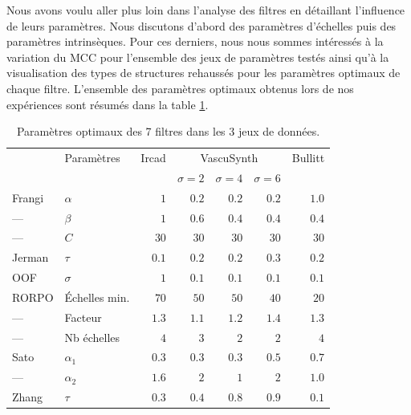 Nous avons voulu aller plus loin dans l'analyse des filtres en détaillant l'influence de leurs paramètres. Nous discutons d'abord des paramètres d'échelles puis des paramètres intrinsèques. Pour ces derniers, nous nous sommes intéressés à la variation du MCC pour l'ensemble des jeux de paramètres testés ainsi qu'à la visualisation des types de structures rehaussés pour les paramètres optimaux de chaque filtre. L'ensemble des paramètres optimaux obtenus lors de nos expériences sont résumés dans la table \ref{tab:optimal_parameters}.
\begin{table}[!ht]
  \begin{center}
  \caption{Paramètres optimaux des 7 filtres dans les 3 jeux de données.}
      \begin{tabular}{llrrrrr}
                          \hline
             & Paramètres  & Ircad       &  \multicolumn{3}{c}{VascuSynth}            &  Bullitt\\
             &   &         & $\sigma = 2$  & $\sigma = 4$ & $\sigma = 6$ &       \\
                         \hline
      Frangi &  $\alpha$  & $1$         & $0.2$     & $0.2$        & $0.2$           & $1.0$   \\
      ---    &  $\beta$   & $1$         & $0.6$     & $0.4$       & $0.4$           & $0.4$   \\
      ---    &  $C$       & $30$        & $30$       & $30$         & $30$            & $30$    \\
      Jerman & $\tau$     & $0.1$       & $0.2$     & $0.2$       & $0.3$          & $0.2$  \\
      OOF &  $\sigma$     & $1$         & $0.1$      & $0.1$        & $0.1$           & $0.1$   \\
      RORPO  & Échelles min.  & $70$        & $50$       & $50$         & $40$            & $20$    \\
      ---    & Facteur      & $1.3$       & $1.1$     & $1.2$       & $1.4$          & $1.3$  \\
      ---    &  Nb échelles  & $4$         & $3$        & $2$          & $2$             & $4$     \\
      Sato   & $\alpha_1$ & $0.3$       & $0.3$      & $0.3$        & $0.5$          & $0.7$   \\
      ---   & $\alpha_2$ & $1.6$       & $2$      & $1$        & $2$           & $1.0$   \\
      Zhang  & $\tau$     & $0.3$       & $0.4$     & $0.8$       & $0.9$          & $0.1$  \\
          \hline
      \end{tabular}
  \label{tab:optimal_parameters}
  \end{center}
\end{table}
